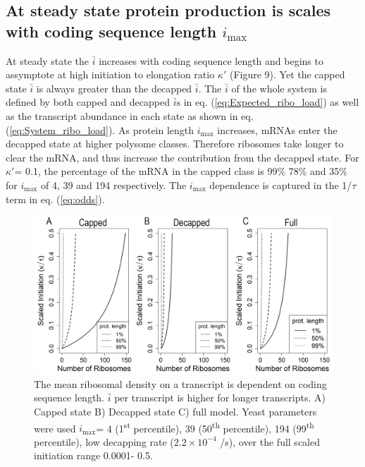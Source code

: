 \documentclass[a4,center,fleqn,nocrop]{NAR}
\newcommand{\imax}{\ensuremath{{i_{\max}}}\xspace}
\newcommand{\MRL}{\ensuremath{\bar{i}}\xspace}
\newcommand{\MRLs}{\ensuremath{\bar{i}\text{s}}\xspace}
\begin{document}
\subsection{At steady state protein production is scales with coding sequence length \imax}
At steady state the \MRL increases with coding sequence length and begins to assymptote at high initiation to elongation ratio $\kappa'$ (Figure 9). %
Yet the capped state \MRL is always greater than the decapped \MRL. The \MRL of the whole system is defined by both capped and decapped \MRLs in eq. (\ref{eq:Expected_ribo_load}) as well as the transcript abundance in each state as shown in eq. (\ref{eq:System_ribo_load}).
As protein length \imax increases, mRNAs enter the decapped state at higher polysome classes. 
Therefore ribosomes take longer  to clear the mRNA, and thus increase the contribution from the decapped state. 
For $\kappa'$= 0.1, the percentage of the mRNA in the capped class is  99\% 78\%  and 35\% for \imax of 4, 39 and 194 respectively.
The \imax dependence is captured in the 1/$\tau$ term in eq. (\ref{eq:odds}).
  
\begin{figure}[!ht]
\begin{center}
\includegraphics[width=120mm]{Images/MRL.png}
\caption{The mean ribosomal density on a transcript is dependent on coding sequence length. \MRL per transcript is higher for longer transcripts. A) Capped state B) Decapped state C) full model. Yeast parameters were used \imax =  4 (1\textsuperscript{st} percentile),  39 (50\textsuperscript{th} percentile), 194 (99\textsuperscript{th} percentile), low decapping rate ($2.2\times 10^{-4}$ /s), over the full scaled initiation range 0.0001- 0.5.}
\end{center}
\end{figure}
\end{document}
